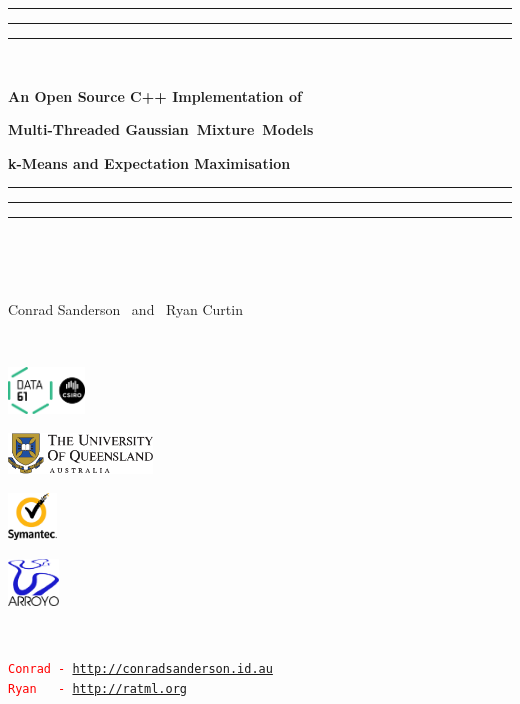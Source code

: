 \documentclass[usenames,dvipsnames]{beamer}
\begin{document}
\begin{frame}
\textcolor{ForestGreen}{\hrule}
\textcolor{ForestGreen}{\hrule}
\textcolor{ForestGreen}{\hrule}
\centerline{~}
\centerline{\Large\bf An Open Source C++ Implementation of}
\centerline{\Large\bf Multi-Threaded Gaussian~Mixture~Models}
\centerline{\Large\bf k-Means and Expectation Maximisation}
\vspace{-1ex}
\textcolor{ForestGreen}{\hrule}
\textcolor{ForestGreen}{\hrule}
\textcolor{ForestGreen}{\hrule}
\centerline{~}
\centerline{~}
\centerline{\large Conrad Sanderson ~and~ Ryan Curtin}
\centerline{~}

\begin{center}
\begin{minipage}{1\textwidth}
\centering

\begin{minipage}{0.24\textwidth}
\centering
\includegraphics[height=1.25cm]{data61_logo_scaled_crop.png}
\end{minipage}
\begin{minipage}{0.35\textwidth}
\centering
\includegraphics[height=1.10cm]{UQ_logo.pdf}
\end{minipage}
\begin{minipage}{0.17\textwidth}
\centering
\includegraphics[height=1.25cm]{symantec_logo.pdf}
\end{minipage}
\begin{minipage}{0.17\textwidth}
\centering
\includegraphics[height=1.25cm]{arroyo_logo.png}
\end{minipage}

\end{minipage}
\end{center}

\centerline{~}


\begin{center}
\begin{minipage}{0.5\textwidth}
{\large\textcolor{red}{\small\texttt{Conrad~-~\href{http://conradsanderson.id.au}{http://conradsanderson.id.au}}}}\\
{\large\textcolor{red}{\small\texttt{Ryan~~~-~\href{http://ratml.org}{http://ratml.org}}}}
\end{minipage}
\end{center}

\end{frame}
\end{document}

